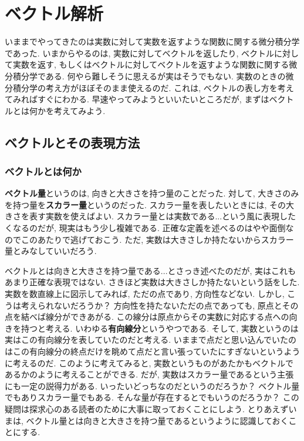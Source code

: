 \chapter{ベクトル解析}
いままでやってきたのは実数に対して実数を返すような関数に関する微分積分学であった. 
いまからやるのは, 実数に対してベクトルを返したり, ベクトルに対して実数を返す, 
もしくはベクトルに対してベクトルを返すような関数に関する微分積分学である. 
何やら難しそうに思えるが実はそうでもない. 実数のときの微分積分学の考え方がほぼそのまま使えるのだ. 
これは, ベクトルの表し方を考えてみればすぐにわかる. 早速やってみようといいたいところだが, 
まずはベクトルとは何かを考えてみよう. 
\section{ベクトルとその表現方法}
\subsection{ベクトルとは何か}
\textbf{ベクトル量}というのは, 向きと大きさを持つ量のことだった. 
対して, 大きさのみを持つ量を\textbf{スカラー量}というのだった. 
スカラー量を表したいときには, その大きさを表す実数を使えばよい. スカラー量とは実数である...という風に表現したくなるのだが, 
現実はもう少し複雑である. 正確な定義を述べるのはやや面倒なのでこのあたりで逃げておこう. 
ただ, 実数は大きさしか持たないからスカラー量とみなしていいだろう. 

ベクトルとは向きと大きさを持つ量である...とさっき述べたのだが, 実はこれもあまり正確な表現ではない. 
さきほど実数は大きさしか持たないという話をした. 実数を数直線上に図示してみれば, ただの点であり, 方向性などない. 
しかし, こうは考えられないだろうか？ 方向性を持たないただの点であっても, 原点とその点を結べば線分ができあがる. 
この線分は原点からその実数に対応する点への向きを持つと考える. いわゆる\textbf{有向線分}というやつである. 
そして, 実数というのは実はこの有向線分を表していたのだと考える. 
いままで点だと思い込んでいたのはこの有向線分の終点だけを眺めて点だと言い張っていたにすぎないというように考えるのだ. 
このように考えてみると, 実数というものがあたかもベクトルであるかのように考えることができる. 
だが, 実数はスカラー量であるという主張にも一定の説得力がある. 
いったいどっちなのだというのだろうか？ ベクトル量でもありスカラー量でもある. 
そんな量が存在するとでもいうのだろうか？ この疑問は探求心のある読者のために大事に取っておくことにしよう. 
とりあえずいまは, ベクトル量とは向きと大きさを持つ量であるというように認識しておくことにする. 

